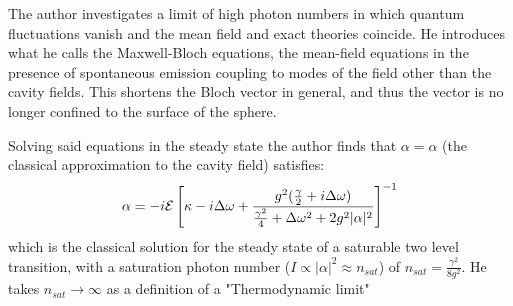 The author investigates a limit of high photon numbers in which quantum fluctuations vanish and the mean field and exact theories coincide. He introduces what he calls the Maxwell-Bloch equations, the mean-field equations in the presence of spontaneous emission coupling to modes of the field other than the cavity fields. This shortens the Bloch vector in general, and thus the vector is no longer confined to the surface of the sphere. 

Solving said equations in the steady state the author finds that $\alpha = \alpha$ (the classical approximation to the cavity field) satisfies:
\begin{equation}
	\alpha = -i \mathcal{E} \left [ \kappa - i \Delta \omega + \frac{g^2(\frac{\gamma}{2} +i \Delta \omega)}{\frac{\gamma^2}{4} + \Delta \omega^2 + 2 g^2 |\alpha|^2} \right ]^{-1}
\end{equation}
which is the classical solution for the steady state of a saturable two level transition, with a saturation photon number ($I \propto |\alpha|^2 \approx n_{sat}$) of $n_{sat} = \frac{\gamma^2}{8g^2}$. He takes $n_{sat} \rightarrow \infty$ as a definition of a "Thermodynamic limit" 